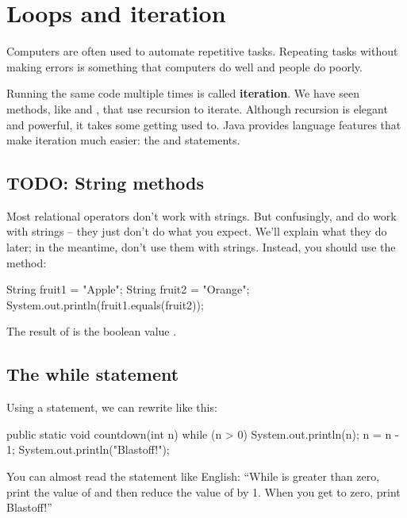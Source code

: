 \chapter{Loops and iteration}

Computers are often used to automate repetitive tasks.
Repeating tasks without making errors is something that computers do well and people do poorly.


Running the same code multiple times is called {\bf iteration}.
We have seen methods, like  and , that use recursion to iterate.
Although recursion is elegant and powerful, it takes some getting used to.
Java provides language features that make iteration much easier:
the  and  statements.


\section{TODO: String methods}

Most relational operators don't work with strings.
But confusingly, \java{==} and \java{!=} do work with strings -- they just don't do what you expect.
We'll explain what they do later; in the meantime, don't use them with strings.
Instead, you should use the  method:

\begin{code}
String fruit1 = "Apple";
String fruit2 = "Orange";
System.out.println(fruit1.equals(fruit2));
\end{code}

The result of  is the boolean value .


\section{The while statement}
\label{while}


Using a  statement, we can rewrite  like this:

\begin{code}
public static void countdown(int n) {
    while (n > 0) {
        System.out.println(n);
        n = n - 1;
    }
    System.out.println("Blastoff!");
}
\end{code}

You can almost read the  statement like English:
``While  is greater than zero, print the value of  and then reduce the value of  by 1.
When you get to zero, print Blastoff!''


